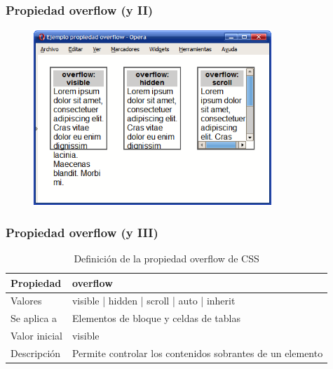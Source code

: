
\begin{frame}
\frametitle{Propiedad overflow (y II)}

\begin{center}
\begin{figure}[p]
\includegraphics[width=0.8\textwidth]{figs/f0524.png}
\end{figure}
\end{center}

\end{frame}



\begin{frame}
\frametitle{Propiedad overflow (y III)}

\begin{center}
  \begin{table}
   \begin{tabular}{p{1.8cm}p{7.8cm}}
Propiedad & \bf{overflow} \\ \hline
Valores& visible | hidden | scroll | auto | inherit \\ \hline
Se aplica a& Elementos de bloque y celdas de tablas \\ \hline
Valor inicial& visible \\ \hline
Descripción& Permite controlar los contenidos sobrantes de un elemento \\ \hline
  \end{tabular}
   \caption{Definición de la propiedad overflow de CSS}
 \end{table}
\end{center}


\end{frame}



